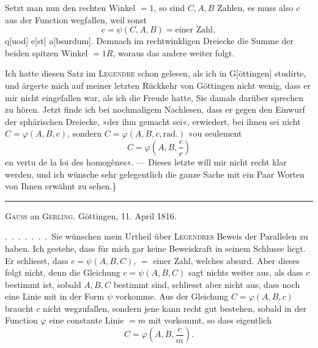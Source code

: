 \begin{center}\end{center}
\noindent Setzt man nun den rechten Winkel $=1$, so sind $C,A,B$ Zahlen, es muss also $c$ aus der Function wegfallen, weil sonst
\[
c=\psi(C,A,B)=\text{einer Zahl},
\]
q[uod] e[st] a[bsurdum]. Demnach im rechtwinkligen Dreiecke die Summe der beiden spitzen Winkel $=1R$, woraus das andere weiter folgt.

Ich hatte diesen Satz im \textsc{Legendre} schon gelesen, als ich in G[öttingen] studirte, und ärgerte mich auf meiner letzten Rückkehr von Göttingen nicht wenig, dass er mir nicht eingefallen war, als ich die Freude hatte, Sie damals darüber sprechen zu hören. Jetzt finde ich bei nochmaligem Nachlesen, dass er gegen den Einwurf der sphärischen Dreiecke, »der ihm gemacht sei«, erwiedert, bei ihnen sei nicht $C=\varphi(A,B,c)$, sondern $C=\varphi(A,B,c,\mathrm{rad.})$ »ou seulement
\[
C=\varphi\!\left(A,B,\frac{c}{r}\right)
\]
en vertu de la loi des homogènes«. --- Dieses letzte will mir nicht recht klar werden, und ich wünsche sehr gelegentlich die ganze Sache mit ein Paar Worten von Ihnen erwähnt zu sehen.\}

\begin{center}\rule{3cm}{0.4pt}\end{center}
\begin{center}\textsc{Gauss} an \textsc{Gerling}. Göttingen, 11. April 1816.\end{center}

.\ .\ .\ .\ .\ .\ .\ Sie wünschen mein Urtheil über \textsc{Legendres} Beweis der Parallelen zu haben. Ich gestehe, dass für mich gar keine Beweiskraft in seinem Schlusse liegt. Er schliesst, dass $c=\psi(A,B,C)$,  $=$ einer Zahl, welches absurd. Aber dieses  folgt nicht, denn die Gleichung $c=\psi(A,B,C)$ sagt nichts weiter aus, als dass $c$ bestimmt ist, sobald $A,B,C$ bestimmt sind, schliesst aber nicht aus, dass noch eine  Linie mit in der Form $\psi$ vorkomme. Aus der Gleichung $C=\varphi(A,B,c)$ braucht $c$ nicht wegzufallen, sondern jene kann recht gut bestehen, sobald in der Function $\varphi$ eine constante Linie $=m$ mit vorkommt, so dass eigentlich
\[
C=\varphi\!\left(A,B,\frac{c}{m}\right).
\]
